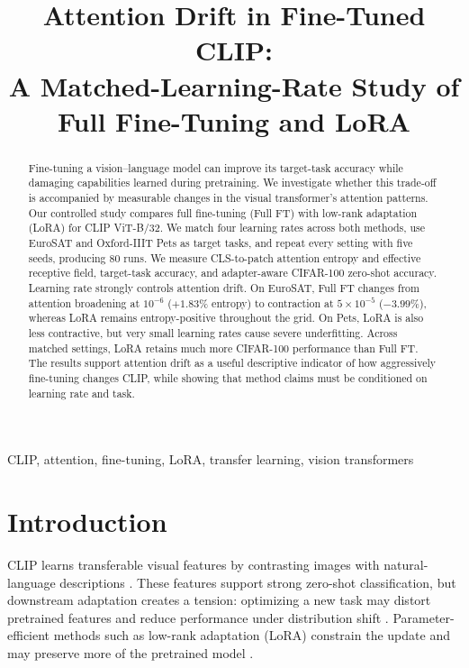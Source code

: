 \documentclass[conference]{IEEEtran}
\title{Attention Drift in Fine-Tuned CLIP:\\
A Matched-Learning-Rate Study of Full Fine-Tuning and LoRA}
\author{\IEEEauthorblockN{Ruize Xia}
\IEEEauthorblockA{\textit{High School Student, Nanjing Foreign Language School}\\
Nanjing, Jiangsu, China\\
xiaruize0911@gmail.com}}
\begin{document}
\maketitle

\begin{abstract}
Fine-tuning a vision--language model can improve its target-task accuracy while damaging capabilities learned during pretraining. We investigate whether this trade-off is accompanied by measurable changes in the visual transformer's attention patterns. Our controlled study compares full fine-tuning (Full FT) with low-rank adaptation (LoRA) for CLIP ViT-B/32. We match four learning rates across both methods, use EuroSAT and Oxford-IIIT Pets as target tasks, and repeat every setting with five seeds, producing 80 runs. We measure CLS-to-patch attention entropy and effective receptive field, target-task accuracy, and adapter-aware CIFAR-100 zero-shot accuracy. Learning rate strongly controls attention drift. On EuroSAT, Full FT changes from attention broadening at $10^{-6}$ ($+1.83\%$ entropy) to contraction at $5\times10^{-5}$ ($-3.99\%$), whereas LoRA remains entropy-positive throughout the grid. On Pets, LoRA is also less contractive, but very small learning rates cause severe underfitting. Across matched settings, LoRA retains much more CIFAR-100 performance than Full FT. The results support attention drift as a useful descriptive indicator of how aggressively fine-tuning changes CLIP, while showing that method claims must be conditioned on learning rate and task.
\end{abstract}

\begin{IEEEkeywords}
CLIP, attention, fine-tuning, LoRA, transfer learning, vision transformers
\end{IEEEkeywords}

\section{Introduction}
CLIP learns transferable visual features by contrasting images with natural-language descriptions \cite{radford2021learning}. These features support strong zero-shot classification, but downstream adaptation creates a tension: optimizing a new task may distort pretrained features and reduce performance under distribution shift \cite{kumar2022finetuning,wortsman2022robust}. Parameter-efficient methods such as low-rank adaptation (LoRA) constrain the update and may preserve more of the pretrained model \cite{hu2022lora}.
\end{document}
